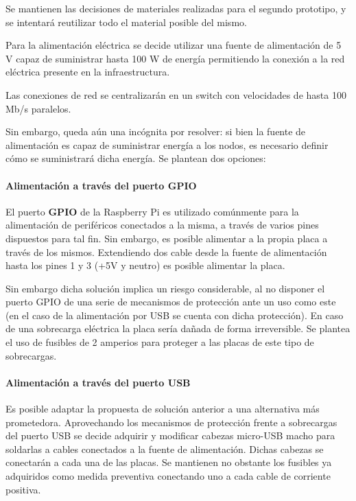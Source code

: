 Se mantienen las decisiones de materiales realizadas para el segundo prototipo, y se intentará reutilizar todo el material posible del mismo.

Para la alimentación eléctrica se decide utilizar una fuente de alimentación de 5 V capaz de suministrar hasta 100 W de energía permitiendo la conexión a la red eléctrica presente en la infraestructura.

Las conexiones de red se centralizarán en un switch con velocidades de hasta 100 Mb/s paralelos.

Sin embargo, queda aún una incógnita por resolver: si bien la fuente de alimentación es capaz de suministrar energía a los nodos, es necesario definir cómo se suministrará dicha energía. Se plantean dos opciones:

\paragraph{Alimentación a través del puerto GPIO\\}

El puerto \textbf{GPIO} de la Raspberry Pi es utilizado comúnmente para la alimentación de periféricos conectados a la misma, a través de varios pines dispuestos para tal fin. Sin embargo, es posible alimentar a la propia placa a través de los mismos. Extendiendo dos cable desde la fuente de alimentación hasta los pines 1 y 3 (+5V y neutro) es posible alimentar la placa.

Sin embargo dicha solución implica un riesgo considerable, al no disponer el puerto GPIO de una serie de mecanismos de protección ante un uso como este (en el caso de la alimentación por USB se cuenta con dicha protección). En caso de una sobrecarga eléctrica la placa sería dañada de forma irreversible. Se plantea el uso de fusibles de 2 amperios para proteger a las placas de este tipo de sobrecargas.

\paragraph{Alimentación a través del puerto USB\\}

Es posible adaptar la propuesta de solución anterior a una alternativa más prometedora. Aprovechando los mecanismos de protección frente a sobrecargas del puerto USB se decide adquirir y modificar cabezas micro-USB macho para soldarlas a cables conectados a la fuente de alimentación. Dichas cabezas se conectarán a cada una de las placas. Se mantienen no obstante los fusibles ya adquiridos como medida preventiva conectando uno a cada cable de corriente positiva.

